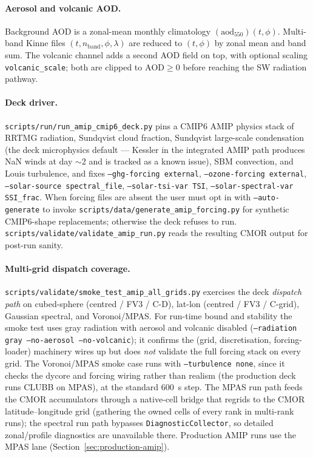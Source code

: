 \documentclass[11pt,twoside]{report}
\begin{document}
\paragraph{Aerosol and volcanic AOD.}
Background AOD is a zonal-mean monthly climatology
$(\mathrm{aod}_{550})(t,\phi)$.  Multi-band Kinne files
$(t, n_{\mathrm{band}}, \phi, \lambda)$ are reduced to $(t, \phi)$ by
zonal mean and band sum.  The volcanic channel adds a second AOD field
on top, with optional scaling \texttt{volcanic\_scale}; both are clipped
to $\mathrm{AOD} \ge 0$ before reaching the SW radiation pathway.

\paragraph{Deck driver.}
\texttt{scripts/run/run\_amip\_cmip6\_deck.py} pins a CMIP6 AMIP physics
stack of RRTMG radiation, Sundqvist cloud fraction, Sundqvist
large-scale condensation (the deck microphysics default --- Kessler
in the integrated AMIP path produces NaN winds at day ${\sim}2$ and
is tracked as a known issue), SBM convection, and Louis turbulence,
and fixes \texttt{--ghg-forcing external}, \texttt{--ozone-forcing external},
\texttt{--solar-source spectral\_file}, \texttt{--solar-tsi-var TSI},
\texttt{--solar-spectral-var SSI\_frac}.  When forcing files are
absent the user must opt in with \texttt{--auto-generate} to invoke
\texttt{scripts/data/generate\_amip\_forcing.py} for synthetic CMIP6-shape
replacements; otherwise the deck refuses to run.
\texttt{scripts/validate/validate\_amip\_run.py} reads the resulting CMOR
output for post-run sanity.

\paragraph{Multi-grid dispatch coverage.}
\texttt{scripts/validate/smoke\_test\_amip\_all\_grids.py} exercises the deck
\emph{dispatch path} on cubed-sphere (centred / FV3 / C-D), lat-lon
(centred / FV3 / C-grid), Gaussian spectral, and Voronoi/MPAS.
For run-time bound and stability the smoke test uses gray radiation
with aerosol and volcanic disabled (\texttt{--radiation gray
--no-aerosol --no-volcanic}); it confirms the (grid, discretisation,
forcing-loader) machinery wires up but does \emph{not} validate the
full forcing stack on every grid.  The Voronoi/MPAS smoke case runs with \texttt{--turbulence none},
since it checks the dycore and forcing wiring rather than realism (the
production deck runs CLUBB on MPAS), at the standard $600$~s step.  The MPAS run
path feeds the CMOR accumulators through a native-cell bridge that regrids to
the CMOR latitude--longitude grid (gathering the owned cells of every rank in
multi-rank runs); the spectral run path bypasses \texttt{DiagnosticCollector},
so detailed zonal/profile diagnostics are unavailable there.  Production AMIP
runs use the MPAS lane (Section~\ref{sec:production-amip}).
\end{document}
